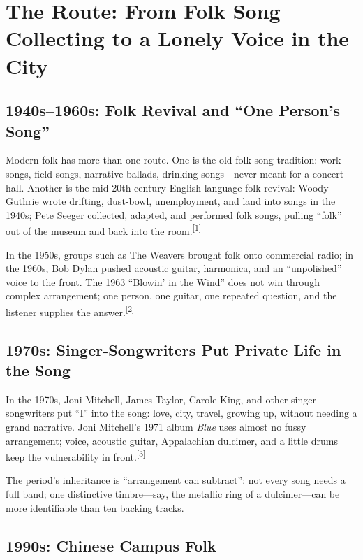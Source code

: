 \section{The Route: From Folk Song Collecting to a Lonely Voice in the City}
\label{sec:folk-history}

\subsection{1940s--1960s: Folk Revival and ``One Person's Song''}
\label{sec:folk-history-1940s}

Modern folk has more than one route. One is the old folk-song tradition: work songs, field songs, narrative ballads, drinking songs---never meant for a concert hall. Another is the mid-20th-century English-language folk revival: Woody Guthrie wrote drifting, dust-bowl, unemployment, and land into songs in the 1940s; Pete Seeger collected, adapted, and performed folk songs, pulling ``folk'' out of the museum and back into the room.{\textsuperscript{[1]}}

In the 1950s, groups such as The Weavers brought folk onto commercial radio; in the 1960s, Bob Dylan pushed acoustic guitar, harmonica, and an ``unpolished'' voice to the front. The 1963 ``Blowin' in the Wind'' does not win through complex arrangement; one person, one guitar, one repeated question, and the listener supplies the answer.{\textsuperscript{[2]}}

\subsection{1970s: Singer-Songwriters Put Private Life in the Song}
\label{sec:folk-history-1970s}

In the 1970s, Joni Mitchell, James Taylor, Carole King, and other singer-songwriters put ``I'' into the song: love, city, travel, growing up, without needing a grand narrative. Joni Mitchell's 1971 album \emph{Blue} uses almost no fussy arrangement; voice, acoustic guitar, Appalachian dulcimer, and a little drums keep the vulnerability in front.{\textsuperscript{[3]}}

The period's inheritance is ``arrangement can subtract'': not every song needs a full band; one distinctive timbre---say, the metallic ring of a dulcimer---can be more identifiable than ten backing tracks.

\subsection{1990s: Chinese Campus Folk}
\label{sec:folk-history-china-1990s}

